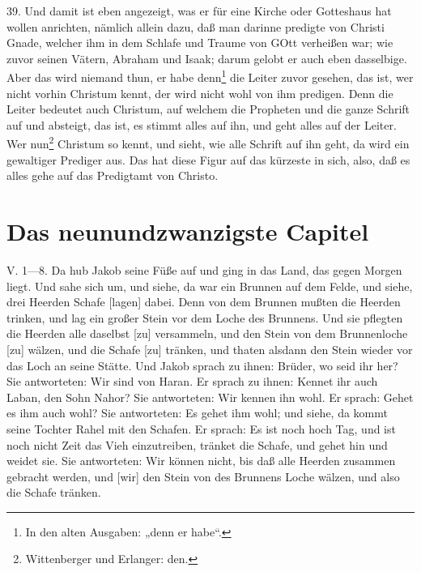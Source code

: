 39. Und damit ist eben angezeigt, was er für eine Kirche oder Gotteshaus hat wollen anrichten, nämlich allein dazu, daß man darinne predigte von Christi Gnade, welcher ihm in dem Schlafe und Traume von GOtt verheißen war; wie zuvor seinen Vätern, Abraham und Isaak; darum gelobt er auch eben dasselbige. Aber das wird niemand thun, er habe denn\footnote{In den alten Ausgaben: „denn er habe“.} die Leiter zuvor gesehen, das ist, wer nicht vorhin Christum kennt, der wird nicht wohl von ihm predigen. Denn die Leiter bedeutet auch Christum, auf welchem die Propheten und die ganze Schrift auf und absteigt, das ist, es stimmt alles auf ihn, und geht alles auf der Leiter. Wer nun\footnote{Wittenberger und Erlanger: den.} Christum so kennt, und sieht, wie alle Schrift auf ihn geht, da wird ein gewaltiger Prediger aus. Das hat diese Figur auf das kürzeste in sich, also, daß es alles gehe auf das Predigtamt von Christo.



\section{Das neunundzwanzigste Capitel}
\begin{schriftzitat}
V. 1—8. Da hub Jakob seine Füße auf und ging in das Land, das gegen Morgen liegt. Und sahe sich um, und siehe, da war ein Brunnen auf dem Felde, und siehe, drei Heerden Schafe [lagen] dabei. Denn von dem Brunnen mußten die Heerden trinken, und lag ein großer Stein vor dem Loche des Brunnens. Und sie pflegten die Heerden alle daselbst [zu] versammeln, und den Stein von dem Brunnenloche [zu] wälzen, und die Schafe [zu] tränken, und thaten alsdann den Stein wieder vor das Loch an seine Stätte. Und Jakob sprach zu ihnen: Brüder, wo seid ihr her? Sie antworteten: Wir sind von Haran. Er sprach zu ihnen: Kennet ihr auch Laban, den Sohn Nahor? Sie antworteten: Wir kennen ihn wohl. Er sprach: Gehet es ihm auch wohl? Sie antworteten: Es gehet ihm wohl; und siehe, da kommt seine Tochter Rahel mit den Schafen. Er sprach: Es ist noch hoch Tag, und ist noch nicht Zeit das Vieh einzutreiben, tränket die Schafe, und gehet hin und weidet sie. Sie antworteten: Wir können nicht, bis daß alle Heerden zusammen gebracht werden, und [wir] den Stein von des Brunnens Loche wälzen, und also die Schafe tränken.
\end{schriftzitat}

